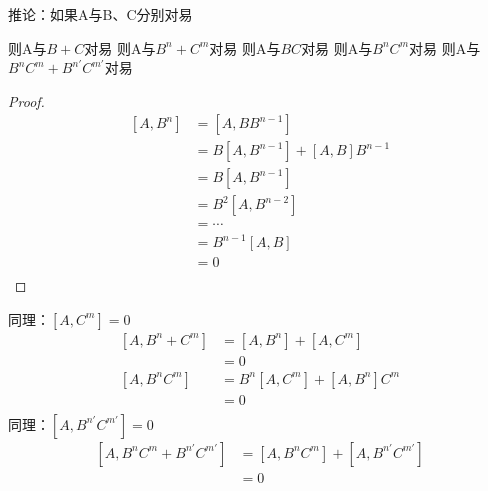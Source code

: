 \begin{frame} 
    \begin{tcolorbox2}{推论：如果A与B、C分别对易}
        \begin{itemize}
            \Item 则A与$B+C$对易
            \Item 则A与$B^n+C^m$对易
            \Item 则A与$BC$对易
            \Item 则A与$B^nC^m$对易
            \Item 则A与$B^nC^m+B^{n'}C^{m'}$对易
        \end{itemize}
    \end{tcolorbox2}
\end{frame} 

\begin{frame} [allowframebreaks=]
    \begin{proof}{}
        \begin{equation*}
            \begin{split} 
             [A,B^{n}]&=[A,BB^{n-1}] \\
             &=B[A,B^{n-1}]+[A,B]B^{n-1}\\
             &=B[A,B^{n-1}] \\
             &=B^2[A,B^{n-2}]\\
             &=\cdots\\
             &=B^{n-1}[A,B]\\
             &= 0\\
            \end{split}  
        \end{equation*}  
    \end{proof}
        同理：$[A,C^{m}]=0$\\
        \begin{equation*}
            \begin{split} 
            [A,B^{n}+C^{m}] &= [A,B^{n}]+[A,C^{m}]\\
            &=0 \\
            [A,B^{n}C^{m}] &= B^{n}[A,C^{m}] + [A,B^{n}] C^{m}\\
            &=0 \\
        \end{split}  
        \end{equation*}
        同理：$[A,B^{n'}C^{m'}]=0$\\
        \begin{equation*}
            \begin{split} 
            [A,B^{n}C^{m}+B^{n'}C^{m'}] &= [A,B^{n}C^{m}]+[A,B^{n'}C^{m'}]\\
            &=0\\
        \end{split}  
        \end{equation*}
\end{frame} 

